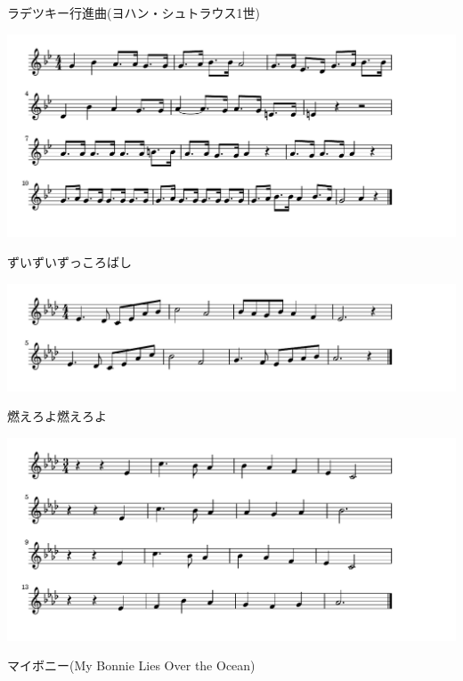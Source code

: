 \documentclass[a4paper]{ltjsarticle}
\begin{document}
\vspace{-10mm} \hspace{10mm}
ラデツキー行進曲(ヨハン・シュトラウス1世)

\includegraphics[clip]{zuizui_crop.pdf}

\vspace{-10mm} \hspace{10mm}
ずいずいずっころばし

\includegraphics[clip]{moeroyo_crop.pdf}

\vspace{-10mm} \hspace{10mm}
燃えろよ燃えろよ

\includegraphics[clip]{mybonnie_crop.pdf}

\vspace{-10mm} \hspace{10mm}
マイボニー(My Bonnie Lies Over the Ocean)
\end{document}
